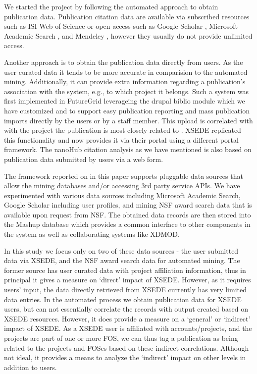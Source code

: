 \documentclass{sig-alternate}
\begin{document}
We started the project by following the automated approach to obtain publication data. Publication citation data are available via subscribed resources such as ISI Web of Science \cite{www-isiwos} or open access such as Google Scholar \cite{www-googlescholar}, Microsoft Academic Search \cite{www-msas}, and Mendeley \cite{www-mendeley}, however they usually do not provide unlimited access. 
 
Another approach is to obtain the publication data directly from users. As the user curated data it tends to be more accurate in comparision to the automated mining. Additionally, it can provide extra information regarding a publication's association with the system, e.g., to which project it belongs. 
Such a system was first implemented in FutureGrid leverageing the drupal biblio module \cite{www-drupal-bib} which we have customized and to support easy publication reporting and mass publication imports directly by the users or by a staff member. This upload is correlated with  with the project the publication is most closely related to \cite{www-fgbiblio}. XSEDE replicated this functionality and now provides it via their portal \cite{www-xdportalpub} using a different portal framework. The nanoHub citation analysis \cite{www-nanohubcite} as we have mentioned is also based on publication data submitted by users via a web form. 
 
The framework reported on in this paper supports pluggable data sources that allow the mining databases and/or accessing 3rd party service APIs. We have experimented with various data sources including Microsoft Academic Search, Google Scholar including user profiles, and mining NSF award search data that is available upon request from NSF. The obtained data records are then stored into the Mashup database which provides a common interface to other components in the system as well as collaborating systems like XDMOD. 
 
In this study we focus only on two of these data sources - the user submitted data via XSEDE, and the NSF award search data for automated mining. The former source has user curated data with project affiliation information, thus in principal it gives a measure on `direct' impact of XSEDE. However, as it requires users' input, the data directly retrieved from XSEDE currently has very limited data entries. In the automated process we obtain publication data for XSEDE users, but can not essentially correlate the records with output created based on XSEDE resources. However, it does  provide a measure on a `general’ or `indirect' impact of XSEDE. As a XSEDE user is affiliated with accounts/projects, and the projects are part of one or more FOS, we can thus tag a publication as being related to the projects and FOSes based on these indirect correlations. Although not ideal, it provides a means to analyze the `indirect' impact on other levels in addition to users. 
 
\end{document}
